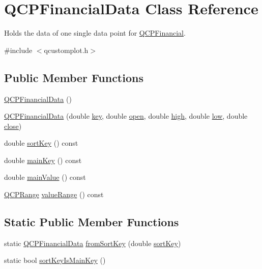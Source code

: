 \hypertarget{class_q_c_p_financial_data}{}\section{Q\+C\+P\+Financial\+Data Class Reference}
\label{class_q_c_p_financial_data}


Holds the data of one single data point for \hyperlink{class_q_c_p_financial}{Q\+C\+P\+Financial}.  




{\ttfamily \#include $<$qcustomplot.\+h$>$}

\subsection*{Public Member Functions}
\begin{DoxyCompactItemize}
\item 
\hyperlink{class_q_c_p_financial_data_a1ca53b3a9ae4e9658a4fd1ca57d76ba4}{Q\+C\+P\+Financial\+Data} ()
\item 
\hyperlink{class_q_c_p_financial_data_a069b72c514dfd4fc8e1d5df811e54ca4}{Q\+C\+P\+Financial\+Data} (double \hyperlink{class_q_c_p_financial_data_a18bc92126f28c214b05b0161e5f5958b}{key}, double \hyperlink{class_q_c_p_financial_data_a3059e1e1fbcb9fd243fde0450f238032}{open}, double \hyperlink{class_q_c_p_financial_data_a299a4b241296fb6cd1baf5ab03f7126a}{high}, double \hyperlink{class_q_c_p_financial_data_aecce0fb45a115e3f3a25eea78491ac16}{low}, double \hyperlink{class_q_c_p_financial_data_a45e9b96944c4a08ea6c82a72d3d22df2}{close})
\item 
double \hyperlink{class_q_c_p_financial_data_ab378e8ef6aef482735aba69115cb442e}{sort\+Key} () const
\item 
double \hyperlink{class_q_c_p_financial_data_af6ed6349c65d938fabd2e4dd2cd499ff}{main\+Key} () const
\item 
double \hyperlink{class_q_c_p_financial_data_a65206c76b6f31a57e04dc7da88c9be60}{main\+Value} () const
\item 
\hyperlink{class_q_c_p_range}{Q\+C\+P\+Range} \hyperlink{class_q_c_p_financial_data_a164d5584eeeb9ba48b4b595ac2ac7fcf}{value\+Range} () const
\end{DoxyCompactItemize}
\subsection*{Static Public Member Functions}
\begin{DoxyCompactItemize}
\item 
static \hyperlink{class_q_c_p_financial_data}{Q\+C\+P\+Financial\+Data} \hyperlink{class_q_c_p_financial_data_a54a0ca7ee7fd7713972477e8e2533ce5}{from\+Sort\+Key} (double \hyperlink{class_q_c_p_financial_data_ab378e8ef6aef482735aba69115cb442e}{sort\+Key})
\item 
static bool \hyperlink{class_q_c_p_financial_data_a1121db9420a7694144f6a99b09257a5f}{sort\+Key\+Is\+Main\+Key} ()
\end{DoxyCompactItemize}
